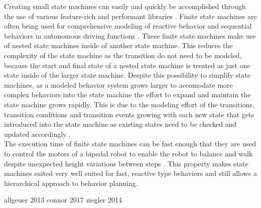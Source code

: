 Creating small state machines can easily and quickly be accomplished through the use of various feature-rich and performant libraries \cite{fourakis2014}. 
Finite state machines are often being used for comprehensive modeling of reactive behavior and sequential behaviors in autonomous driving functions \cite{ziegler2014}. These finite state machines make use of nested state machines inside of another state machine. This reduces the complexity of the state machine as the transition do not need to be modeled, because the start and final state of a nested state machine is treated as just one state inside of the larger state machine. Despite this possibility to simplify state machines, as a modeled behavior system grows larger to accomodate more complex behaviors into the state machine the effort to expand and maintain the state machine grows rapidly. This is due to the modeling effort of the transitions, transition conditions and transition events growing with each new state that gets introduced into the state machine as existing states need to be checked and updated accordingly \cite{conner2017}. \\

The execution time of finite state machines can be fast enough that they are used to control the motors of a bipedal robot to enable the robot to balance and walk despite unexpected height variations between steps \cite{park2013}. This property makes state machines suited very well suited for fast, reactive type behaviors and still allows a hierarchical approach to behavior planning.



allgeuer 2013
connor 2017
ziegler 2014

